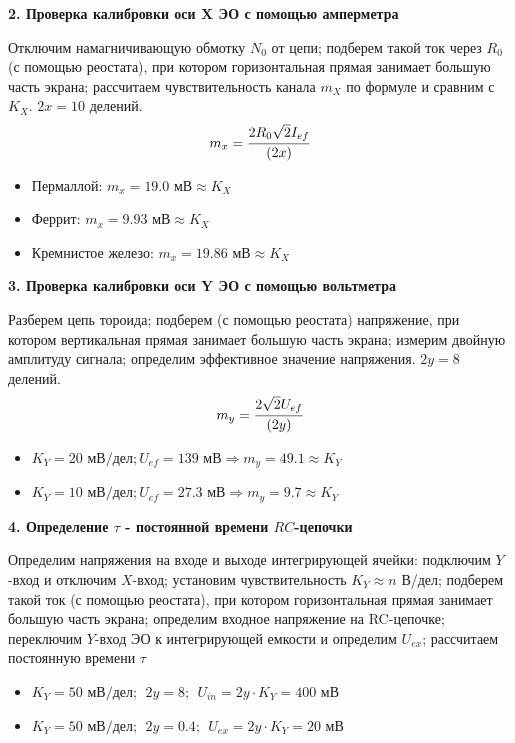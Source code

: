 \documentclass[a4paper, 12pt]{article}
\begin{document}
\begin{center}
\textbf{2. Проверка калибровки оси X ЭО с помощью амперметра}
\end{center}

Отключим намагничивающую обмотку $N_0$ от цепи;  подберем такой ток через $R_0$ (с помощью реостата), при котором горизонтальная прямая занимает большую часть экрана; рассчитаем чувствительность канала $m_X$ по формуле и сравним с $K_X$. $2x=10$ делений.
$$m_x=\cfrac{2R_0\sqrt{2}I_{ef}}{(2x)}$$
\begin{itemize}
	\item Пермаллой: $m_x= 19.0 \text{ мВ} \approx K_X$
	\item Феррит: $m_x= 9.93 \text{ мВ} \approx K_X$
	\item Кремнистое железо: $m_x= 19.86 \text{ мВ} \approx K_X$
\end{itemize}

\newpage

\begin{center}
\textbf{3. Проверка калибровки оси Y ЭО с помощью вольтметра}
\end{center}

Разберем цепь тороида; подберем (с помощью реостата) напряжение, при котором вертикальная прямая занимает большую часть экрана; измерим двойную амплитуду сигнала; определим эффективное значение напряжения. $2y = 8$ делений.
$$m_y=\cfrac{2\sqrt{2}U_{ef}}{(2y)}$$
\begin{itemize}
	\item $K_Y=20 \text{ мВ/дел}; U_{ef}=139  \text{ мВ} \Rightarrow m_y = 49.1 \approx K_Y$
	\item $K_Y= 10 \text{ мВ/дел}; U_{ef}=27.3  \text{ мВ}\Rightarrow m_y = 9.7 \approx K_Y$
\end{itemize}


\begin{center}
\textbf{4. Определение $\tau$ - постоянной времени $RC$-цепочки}
\end{center}
Определим напряжения на входе и выходе интегрирующей ячейки: подключим $Y$-вход и отключим $X$-вход; установим чувствительность $K_Y \approx n$ В/дел; подберем такой ток (с помощью реостата), при котором горизонтальная прямая занимает большую часть экрана; определим входное напряжение на RC-цепочке; переключим $Y$-вход ЭО к интегрирующей емкости и определим $U_{ex}$; рассчитаем постоянную времени $\tau$
\begin{itemize}
	\item $K_Y =50 \text{ мВ/дел};~~ 2y=8;~~  U_{in}=2y\cdot K_Y=400 \text{ мВ}$
	\item $K_Y =50 \text{ мВ/дел};~~ 2y=0.4;~~ U_{ex}=2y\cdot K_Y=20 \text{ мВ}$
\end{itemize}
\end{document}
